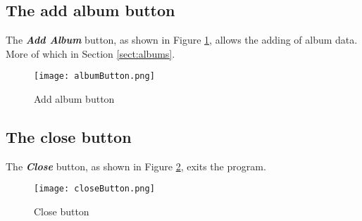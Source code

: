 \subsection{The add album button}
The \textbf{\textit{Add Album}} button, as shown in Figure \ref{fig:addalbumbutton}, allows the adding of album data.  More of which in Section \ref{sect:albums}.
\begin{figure}[h]
\texttt{[image: albumButton.png]}
\caption{Add album button}
\label{fig:addalbumbutton}
\end{figure}

\subsection{The close button}
The \textbf{\textit{Close}} button, as shown in Figure \ref{fig:closebutton}, exits the program.
\begin{figure}[h]
\texttt{[image: closeButton.png]}
\caption{Close button}
\label{fig:closebutton}
\end{figure}